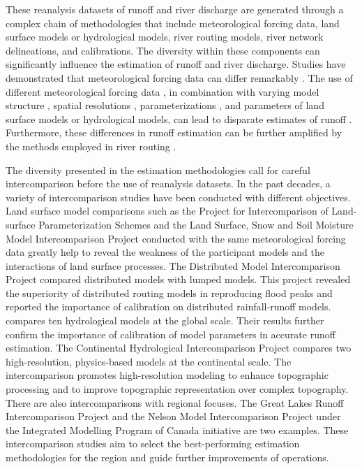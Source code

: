 \documentclass[preprint, review, authoryear, longtitle, 12pt, 3p]{elsarticle}
\begin{document}
These reanalysis datasets of runoff and river discharge are generated through a complex chain of methodologies that include meteorological forcing data, land surface models or hydrological models, river routing models, river network delineations, and calibrations. The diversity within these components can significantly influence the estimation of runoff and river discharge. Studies have demonstrated that meteorological forcing data can differ remarkably \citep{sun2018RG, henn2018JH}. The use of different meteorological forcing data \citep{renard2010WRR, bai2024JGRA}, in combination with varying model structure \citep{butts2004JH}, spatial resolutions \citep{haddeland2002WRR, barnhart2024WRR, li2022GMD}, parameterizations \citep{zheng2019WRR,zheng2023ESSD}, and parameters \citep{li2020JAMS} of land surface models or hydrological models, can lead to disparate estimates of runoff \citep{saxe2021HESS, beck2017HESS}. Furthermore, these differences in runoff estimation can be further amplified by the methods employed in river routing \citep{fry2014JH, mai2022HESS, ahmed2023JH}.

The diversity presented in the estimation methodologies call for careful intercomparison before the use of reanalysis datasets. In the past decades, a variety of intercomparison studies have been conducted with different objectives. Land surface model comparisons such as the Project for Intercomparison of Land-surface Parameterization Schemes \citep{henderson-sellers1993BAMS} and the Land Surface, Snow and Soil Moisture Model Intercomparison Project \citep{van_den_hurk2016GMD} conducted with the same meteorological forcing data greatly help to reveal the weakness of the participant models and the interactions of land surface processes. The Distributed Model Intercomparison Project \citep{reed2004JH, smith2004JH} compared distributed models with lumped models. This project revealed the superiority of distributed routing models in reproducing flood peaks and reported the importance of calibration on distributed rainfall-runoff models. \citet{beck2017HESS} compares ten hydrological models at the global scale. Their results further confirm the importance of calibration of model parameters in accurate runoff estimation. The Continental Hydrological Intercomparison Project \citep{tijerina2021WRR} compares two high-resolution, physics-based models at the continental scale. The intercomparison promotes high-resolution modeling to enhance topographic processing and to improve topographic representation over complex topography. There are also intercomparisons with regional focuses. The Great Lakes Runoff Intercomparison Project \citep{mai2022HESS} and the Nelson Model Intercomparison Project under the Integrated Modelling Program of Canada initiative \citep{ahmed2023JH} are two examples. These intercomparison studies aim to select the best-performing estimation methodologies for the region and guide further improvements of operations.
\end{document}

